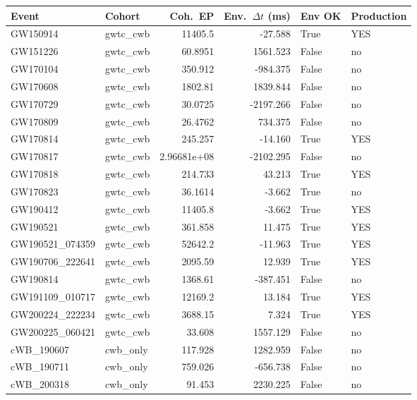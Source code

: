 \begin{tabular}{llrrll}
\hline
Event & Cohort & Coh.\ EP & Env.\ $\Delta t$ (ms) & Env OK & Production \\
\hline
GW150914 & gwtc_cwb & 11405.5 & -27.588 & True & YES \\
GW151226 & gwtc_cwb & 60.8951 & 1561.523 & False & no \\
GW170104 & gwtc_cwb & 350.912 & -984.375 & False & no \\
GW170608 & gwtc_cwb & 1802.81 & 1839.844 & False & no \\
GW170729 & gwtc_cwb & 30.0725 & -2197.266 & False & no \\
GW170809 & gwtc_cwb & 26.4762 & 734.375 & False & no \\
GW170814 & gwtc_cwb & 245.257 & -14.160 & True & YES \\
GW170817 & gwtc_cwb & 2.96681e+08 & -2102.295 & False & no \\
GW170818 & gwtc_cwb & 214.733 & 43.213 & True & YES \\
GW170823 & gwtc_cwb & 36.1614 & -3.662 & True & no \\
GW190412 & gwtc_cwb & 11405.8 & -3.662 & True & YES \\
GW190521 & gwtc_cwb & 361.858 & 11.475 & True & YES \\
GW190521_074359 & gwtc_cwb & 52642.2 & -11.963 & True & YES \\
GW190706_222641 & gwtc_cwb & 2095.59 & 12.939 & True & YES \\
GW190814 & gwtc_cwb & 1368.61 & -387.451 & False & no \\
GW191109_010717 & gwtc_cwb & 12169.2 & 13.184 & True & YES \\
GW200224_222234 & gwtc_cwb & 3688.15 & 7.324 & True & YES \\
GW200225_060421 & gwtc_cwb & 33.608 & 1557.129 & False & no \\
cWB_190607 & cwb_only & 117.928 & 1282.959 & False & no \\
cWB_190711 & cwb_only & 759.026 & -656.738 & False & no \\
cWB_200318 & cwb_only & 91.453 & 2230.225 & False & no \\
\hline
\end{tabular}
